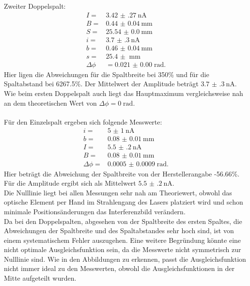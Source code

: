 Zweiter Doppelspalt:
\begin{align*}
  I =& \SI{3.42(27)}{\nA}\\
  B =& \SI{0.44(4)}{\mm}\\
  S =& \SI{25.54(0)}{\mm}\\
  i =& \SI{3.7(3)}{\nA}\\
  b =& \SI{0.46(4)}{\mm}\\
  s =& \SI{25.4(0)}{\mm}\\
  \Delta \phi &=\SI{0.021(0)}\; \text{rad}.
\end{align*}
Hier ligen die Abweichungen für die Spaltbreite bei
350\% und für die Spaltabstand bei 6267.5\%.
Der Mittelwert der Amplitude beträgt $\SI{3.7(3)}{\nA}$. Wie beim ersten Doppelspalt auch
liegt das Hauptmaximum vergleichsweise nah an dem theoretischen Wert von
$ \Delta \phi= 0\;\text{rad}$.\\
\\
Für den Einzelspalt ergeben sich folgende Messwerte:
\begin{align*}
  i =& \SI{5(1)}{\nA}\\
  b =& \SI{0.08(1)}{\mm}\\
  I =& \SI{5.5(2)}{\nA}\\
  B =& \SI{0.08(1)}{\mm}\\
  \Delta \phi=& \SI{0.0005(9)}\; \text{rad}.
\end{align*}
Hier beträgt die Abweichung der Spaltbreite von der Herstellerangabe
-56.66\%. Für die Amplitude ergibt sich als Mittelwert $\SI{5.5(2)}{\nA}$.
\\
Die Nulllinie liegt bei allen Messungen sehr nah am Theoriewert, obwohl das
optische Element per Hand im Strahlengang des Lasers platziert wird und schon minimale
Positionsänderungen das Interferenzbild verändern.\\
Da bei den Doppelspalten, abgesehen von der Spaltbreite des ersten Spaltes, die Abweichungen
der Spaltbreite und des Spaltabstandes
sehr hoch sind, ist von einem systematischem Fehler auszugehen. Eine weitere
Begründung könnte eine nicht optimale Ausgleichsfunktion sein, da die Messwerte
nicht symmetrisch zur Nulllinie sind. Wie in den Abbildungen
zu erkennen, passt die Ausgleichsfunktion nicht immer ideal zu den Messwerten, obwohl
die Ausgleichsfunktionen in der Mitte aufgeteilt wurden.
